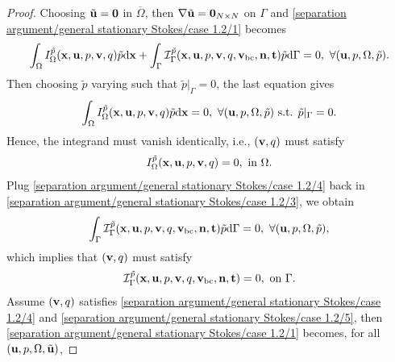 \documentclass[oneside,11pt]{book}
\numberwithin{equation}{section}
\begin{document}
\begin{enumerate}[leftmargin=0mm]
\begin{itemize}[leftmargin=0in]
        \begin{proof}
            Choosing $\tilde{\bf u} = {\bf 0}$ in $\overline{\Omega}$, then $\nabla\tilde{\bf u} = {\bf 0}_{N\times N}$ on $\Gamma$ and \eqref{separation argument/general stationary Stokes/case 1.2/1} becomes
            \begin{align}
                \label{separation argument/general stationary Stokes/case 1.2/3}
                \int_\Omega I_\Omega^{\tilde{p}}({\bf x},{\bf u},p,{\bf v},q)\tilde{p}{\rm d}{\bf x} + \int_\Gamma \mathcal{I}_\Gamma^{\tilde{p}}({\bf x},{\bf u},p,{\bf v},q,{\bf v}_{\rm bc},{\bf n},{\bf t})\tilde{p}{\rm d}\Gamma = 0,\ \forall({\bf u},p,\Omega,\tilde{p}).
            \end{align}
            Then choosing $\tilde{p}$ varying such that $\tilde{p}|_\Gamma = 0$, the last equation gives
            \begin{align*}
                \int_\Omega I_\Omega^{\tilde{p}}({\bf x},{\bf u},p,{\bf v},q)\tilde{p}{\rm d}{\bf x} = 0,\ \forall({\bf u},p,\Omega,\tilde{p})\mbox{ s.t. }\tilde{p}|_\Gamma = 0.
            \end{align*}
            Hence, the integrand must vanish identically, i.e., $({\bf v},q)$ must satisfy
            \begin{align}
                \label{separation argument/general stationary Stokes/case 1.2/4}
                I_\Omega^{\tilde{p}}({\bf x},{\bf u},p,{\bf v},q) = 0,\mbox{ in }\Omega.
            \end{align}
            Plug \eqref{separation argument/general stationary Stokes/case 1.2/4} back in \eqref{separation argument/general stationary Stokes/case 1.2/3}, we obtain
            \begin{align*}
                \int_\Gamma \mathcal{I}_\Gamma^{\tilde{p}}({\bf x},{\bf u},p,{\bf v},q,{\bf v}_{\rm bc},{\bf n},{\bf t})\tilde{p}{\rm d}\Gamma = 0,\ \forall({\bf u},p,\Omega,\tilde{p}),
            \end{align*}
            which implies that $({\bf v},q)$ must satisfy
            \begin{align}
                \label{separation argument/general stationary Stokes/case 1.2/5}
                \mathcal{I}_\Gamma^{\tilde{p}}({\bf x},{\bf u},p,{\bf v},q,{\bf v}_{\rm bc},{\bf n},{\bf t}) = 0,\mbox{ on }\Gamma.
            \end{align}
            Assume $({\bf v},q)$ satisfies \eqref{separation argument/general stationary Stokes/case 1.2/4} and \eqref{separation argument/general stationary Stokes/case 1.2/5}, then \eqref{separation argument/general stationary Stokes/case 1.2/1} becomes, for all $({\bf u},p,\Omega,\tilde{\bf u})$,

\end{proof}
\end{itemize}
\end{enumerate}
\end{document}

